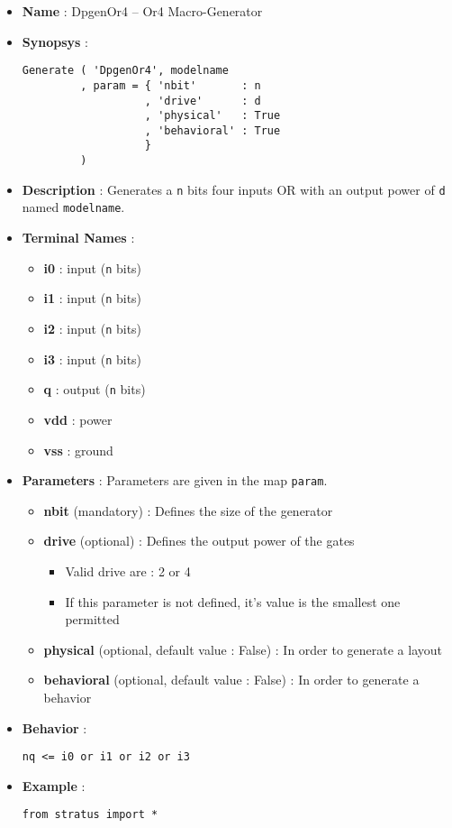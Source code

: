 \begin{itemize}
    \item \textbf{Name} : DpgenOr4 -- Or4 Macro-Generator
    \item \textbf{Synopsys} :
\begin{verbatim}
Generate ( 'DpgenOr4', modelname
         , param = { 'nbit'       : n
                   , 'drive'      : d
                   , 'physical'   : True
                   , 'behavioral' : True                   
                   }
         )
\end{verbatim}
    \item \textbf{Description} : Generates a \verb-n- bits four inputs OR with an output power of \verb-d- named \verb-modelname-.
    \item \textbf{Terminal Names} :
    \begin{itemize}
        \item \textbf{i0} : input (\verb-n- bits)
        \item \textbf{i1} : input (\verb-n- bits)
        \item \textbf{i2} : input (\verb-n- bits)
        \item \textbf{i3} : input (\verb-n- bits)
        \item \textbf{q} : output (\verb-n- bits)
        \item \textbf{vdd} : power
        \item \textbf{vss} : ground
    \end{itemize}
    \item \textbf{Parameters} : Parameters are given in the map \verb-param-.
    \begin{itemize}
        \item \textbf{nbit} (mandatory) : Defines the size of the generator
        \item \textbf{drive} (optional) : Defines the output power of the gates
        \begin{itemize}
            \item Valid drive are : 2 or 4
            \item If this parameter is not defined, it's value is the smallest one permitted
        \end{itemize}
        \item \textbf{physical} (optional, default value : False) : In order to generate a layout
        \item \textbf{behavioral} (optional, default value : False) : In order to generate a behavior        
    \end{itemize}
    \item \textbf{Behavior} :
\begin{verbatim}
nq <= i0 or i1 or i2 or i3
\end{verbatim}
    \item \textbf{Example} :
\begin{verbatim}
from stratus import *


\end{verbatim}
\end{itemize}
